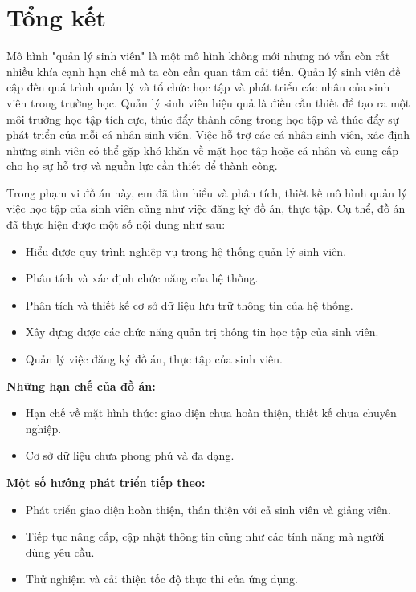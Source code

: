 \chapter{Tổng kết}
Mô hình "quản lý sinh viên" là một mô hình không mới nhưng nó vẫn còn rất nhiều khía cạnh hạn chế mà ta còn cần quan tâm cải tiến.
Quản lý sinh viên đề cập đến quá trình quản lý và tổ chức học tập và phát triển các nhân của sinh viên trong trường học.
Quản lý sinh viên hiệu quả là điều cần thiết để tạo ra một môi trường học tập tích cực, thúc đẩy thành công trong học tập và thúc đẩy sự phát triển của mỗi cá nhân sinh viên.
Việc hỗ trợ các cá nhân sinh viên, xác định những sinh viên có thể gặp khó khăn về mặt học tập hoặc cá nhân và cung cấp cho họ sự hỗ trợ và nguồn lực cần thiết để thành công.

Trong phạm vi đồ án này, em đã tìm hiểu và phân tích, thiết kế mô hình quản lý việc học tập của sinh viên cũng như việc đăng ký đồ án, thực tập. Cụ thể, đồ án đã thực hiện được một số nội dung như sau:
  \begin{itemize}
    \item Hiểu được quy trình nghiệp vụ trong hệ thống quản lý sinh viên.
    \item Phân tích và xác định chức năng của hệ thống.
    \item Phân tích và thiết kế cơ sở dữ liệu lưu trữ thông tin của hệ thống.
    \item Xây dựng được các chức năng quản trị thông tin học tập của sinh viên.
    \item Quản lý việc đăng ký đồ án, thực tập của sinh viên.
  \end{itemize}


\noindent\textbf{Những hạn chế của đồ án:}
\begin{itemize}
  \item Hạn chế về mặt hình thức: giao diện chưa hoàn thiện, thiết kế chưa chuyên nghiệp.
  \item Cơ sở dữ liệu chưa phong phú và đa dạng.
\end{itemize}

\noindent\textbf{Một số hướng phát triển tiếp theo:}
  \begin{itemize}
    \item Phát triển giao diện hoàn thiện, thân thiện với cả sinh viên và giảng viên.
    \item Tiếp tục nâng cấp, cập nhật thông tin cũng như các tính năng mà người dùng yêu cầu.
    \item Thử nghiệm và cải thiện tốc độ thực thi của ứng dụng.
  \end{itemize}
